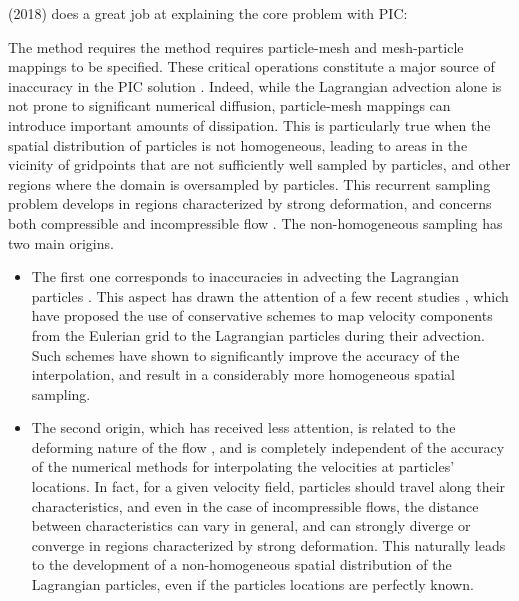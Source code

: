 \textcite{samu18} (2018) does a great job at explaining the core problem with PIC: 
\begin{displayquote}
{\color{darkgray}
The method requires the method requires particle-mesh 
and mesh-particle mappings to be specified. These critical operations constitute a
major source of inaccuracy in the PIC solution \cite{mona85,dumg11,thmk14}. 
Indeed, while the Lagrangian advection alone is not prone
to significant numerical diffusion, particle-mesh mappings can introduce 
important amounts of dissipation. This is particularly true
when the spatial distribution of particles is not homogeneous, leading 
to areas in the vicinity of gridpoints that are not sufficiently
well sampled by particles, and other regions where the domain is
oversampled by particles. This recurrent sampling problem develops 
in regions characterized by strong deformation, and concerns
both compressible and incompressible flow \cite{waav15,pukp17}. 
The non-homogeneous sampling has two main origins. 
\begin{itemize}
\item The first one corresponds to inaccuracies in advecting the
Lagrangian particles \cite{meje04}. This aspect has drawn
the attention of a few recent studies \cite{waav15,pukp17}, 
which have proposed the use of conservative schemes to
map velocity components from the Eulerian grid to the Lagrangian
particles during their advection. Such schemes have shown to significantly 
improve the accuracy of the interpolation, and result in
a considerably more homogeneous spatial sampling. \\
\item The second origin, which has received less attention, is related to the deforming
nature of the flow \cite{modm03}, and is completely independent 
of the accuracy of the numerical methods for interpolating
the velocities at particles' locations. In fact, for a given velocity
field, particles should travel along their characteristics, and even in
the case of incompressible flows, the distance between characteristics 
can vary in general, and can strongly diverge or converge in
regions characterized by strong deformation. This naturally leads to
the development of a non-homogeneous spatial distribution of the
Lagrangian particles, even if the particles locations are perfectly
known.
\end{itemize}
}
\end{displayquote}


